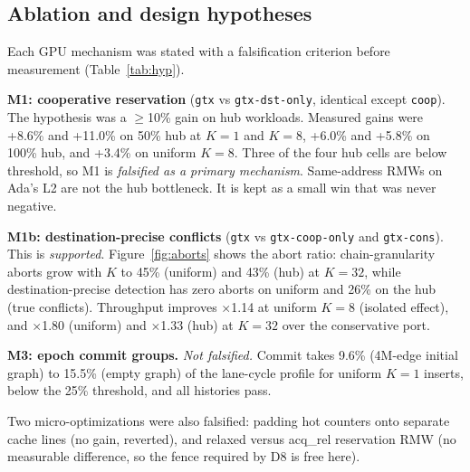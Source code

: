 \documentclass[sigconf,nonacm]{acmart}
\newcommand{\code}[1]{\texttt{#1}}
\begin{document}
\subsection{Ablation and design hypotheses}
\label{sec:ablation}
Each GPU mechanism was stated with a falsification criterion before measurement (Table~\ref{tab:hyp}).

\textbf{M1: cooperative reservation} (\code{gtx} vs \code{gtx-dst-only}, identical except \code{coop}). The
hypothesis was a $\ge$10\% gain on hub workloads. Measured gains were +8.6\% and +11.0\% on 50\% hub at $K{=}1$ and
$K{=}8$, +6.0\% and +5.8\% on 100\% hub, and +3.4\% on uniform $K{=}8$. Three of the four hub cells are below
threshold, so M1 is \emph{falsified as a primary mechanism}. Same-address RMWs on Ada's L2 are not the hub bottleneck.
It is kept as a small win that was never negative.

\textbf{M1b: destination-precise conflicts} (\code{gtx} vs \code{gtx-coop-only} and \code{gtx-cons}). This is
\emph{supported}. Figure~\ref{fig:aborts} shows the abort ratio: chain-granularity aborts grow with $K$ to 45\%
(uniform) and 43\% (hub) at $K{=}32$, while destination-precise detection has zero aborts on uniform and 26\% on the
hub (true conflicts). Throughput improves $\times$1.14 at uniform $K{=}8$ (isolated effect), and $\times$1.80
(uniform) and $\times$1.33 (hub) at $K{=}32$ over the conservative port.

\textbf{M3: epoch commit groups.} \emph{Not falsified.} Commit takes 9.6\% (4M-edge initial graph) to 15.5\% (empty
graph) of the lane-cycle profile for uniform $K{=}1$ inserts, below the 25\% threshold, and all histories pass.

Two micro-optimizations were also falsified: padding hot counters onto separate cache lines (no gain, reverted), and
relaxed versus acq\_rel reservation RMW (no measurable difference, so the fence required by D8 is free here).
\end{document}
